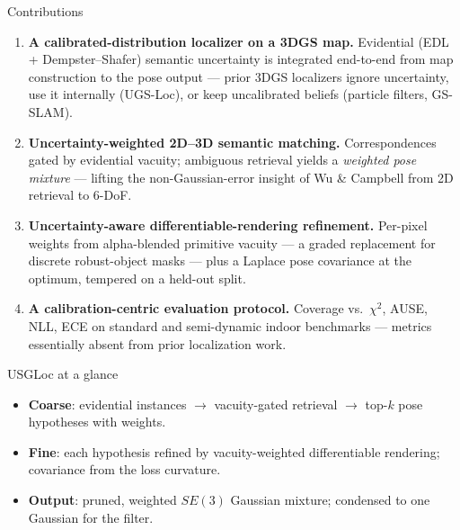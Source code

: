 \documentclass[aspectratio=169,10pt]{beamer}
\def\figpath{figures/}
\newcommand{\method}{USGLoc}
\begin{document}
\begin{frame}{Contributions}
  \begin{enumerate}
    \item \textbf{A calibrated-distribution localizer on a 3DGS map.}
          Evidential (EDL + Dempster--Shafer) semantic uncertainty is
          integrated end-to-end from map construction to the pose output ---
          prior 3DGS localizers ignore uncertainty, use it internally
          (UGS-Loc), or keep uncalibrated beliefs (particle filters,
          GS-SLAM).
    \vspace{1mm}
    \item \textbf{Uncertainty-weighted 2D--3D semantic matching.}
          Correspondences gated by evidential vacuity; ambiguous retrieval
          yields a \emph{weighted pose mixture} --- lifting the
          non-Gaussian-error insight of Wu \& Campbell from 2D retrieval to
          6-DoF.
    \vspace{1mm}
    \item \textbf{Uncertainty-aware differentiable-rendering refinement.}
          Per-pixel weights from alpha-blended primitive vacuity --- a graded
          replacement for discrete robust-object masks --- plus a Laplace
          pose covariance at the optimum, tempered on a held-out split.
    \vspace{1mm}
    \item \textbf{A calibration-centric evaluation protocol.}
          Coverage vs.\ $\chi^2$, AUSE, NLL, ECE on standard and
          semi-dynamic indoor benchmarks --- metrics essentially absent
          from prior localization work.
  \end{enumerate}
\end{frame}

\begin{frame}{\method{} at a glance}
  \centering
  \resizebox{\textwidth}{!}{}
  \vspace{3mm}
  \begin{itemize}\small
    \item \textbf{Coarse}: evidential instances $\rightarrow$ vacuity-gated
          retrieval $\rightarrow$ top-$k$ pose hypotheses with weights.
    \item \textbf{Fine}: each hypothesis refined by vacuity-weighted
          differentiable rendering; covariance from the loss curvature.
    \item \textbf{Output}: pruned, weighted $SE(3)$ Gaussian mixture;
          condensed to one Gaussian for the filter.
  \end{itemize}
\end{frame}
\end{document}

